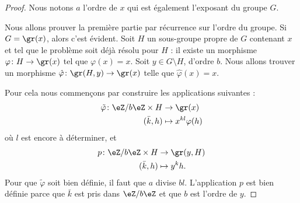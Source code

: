 \begin{proof}
    Nous notons \( a\) l'ordre de \( x\) qui est également l'exposant du groupe \( G\).

    Nous allons prouver la première partie par récurrence sur l'ordre du groupe. Si \( G=\gr(x)\), alors c'est évident. Soit \( H\) un sous-groupe propre de \( G\) contenant \( x\) et tel que le problème soit déjà résolu pour \( H\) : il existe un morphisme \( \varphi\colon H\to \gr(x)\) tel que \( \varphi(x)=x\). Soit \( y\in G\setminus H\), d'ordre \( b\). Nous allons trouver un morphisme $\hat\varphi\colon \gr(H,y)\to \gr(x) $ telle que \( \hat\varphi(x)=x\).

    Pour cela nous commençons par construire les applications suivantes :
    \begin{equation}
        \begin{aligned}
            \tilde \varphi\colon \eZ/b\eZ\times H&\to \gr(x) \\
            (\bar k,h)&\mapsto x^{kl}\varphi(h) 
        \end{aligned}
    \end{equation}
    où \( l\) est encore à déterminer, et
    \begin{equation}
        \begin{aligned}
            p\colon \eZ/b\eZ\times H&\to \gr(y,H) \\
            (\bar k,h)&\mapsto y^kh. 
        \end{aligned}
    \end{equation}
    Pour que \( \tilde \varphi\) soit bien définie, il faut que \( a\) divise \( bl\). L'application \( p\) est bien définie parce que \( \bar k\) est pris dans \( \eZ/b\eZ\) et que \( b\) est l'ordre de \( y\).


\end{proof}
